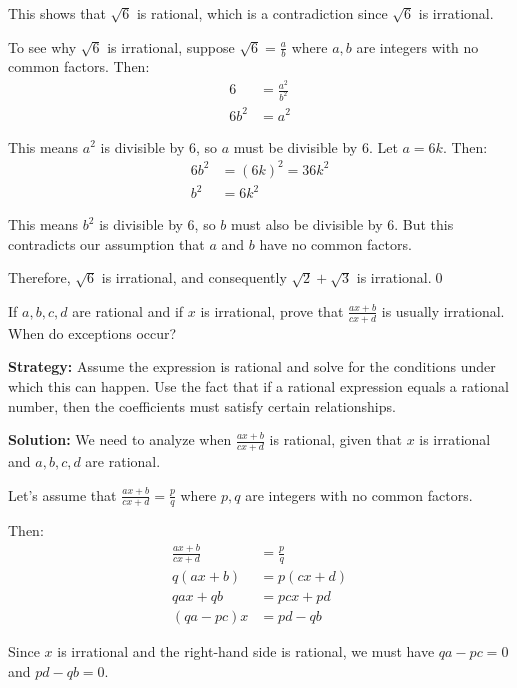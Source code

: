 This shows that $\sqrt{6}$ is rational, which is a contradiction since $\sqrt{6}$ is irrational.

To see why $\sqrt{6}$ is irrational, suppose $\sqrt{6} = \frac{a}{b}$ where $a, b$ are integers with no common factors. Then:
\begin{align*}
6 &= \frac{a^2}{b^2} \\
6b^2 &= a^2
\end{align*}

This means $a^2$ is divisible by 6, so $a$ must be divisible by 6. Let $a = 6k$. Then:
\begin{align*}
6b^2 &= (6k)^2 = 36k^2 \\
b^2 &= 6k^2
\end{align*}

This means $b^2$ is divisible by 6, so $b$ must also be divisible by 6. But this contradicts our assumption that $a$ and $b$ have no common factors.

Therefore, $\sqrt{6}$ is irrational, and consequently $\sqrt{2} + \sqrt{3}$ is irrational.\qed


\begin{problembox}
If $a, b, c, d$ are rational and if $x$ is irrational, prove that $\frac{ax + b}{cx + d}$ is usually irrational. When do exceptions occur?
\end{problembox}

\noindent\textbf{Strategy:} Assume the expression is rational and solve for the conditions under which this can happen. Use the fact that if a rational expression equals a rational number, then the coefficients must satisfy certain relationships.

\bigskip\noindent\textbf{Solution:}
We need to analyze when $\frac{ax + b}{cx + d}$ is rational, given that $x$ is irrational and $a, b, c, d$ are rational.

Let's assume that $\frac{ax + b}{cx + d} = \frac{p}{q}$ where $p, q$ are integers with no common factors.

Then:
\begin{align*}
\frac{ax + b}{cx + d} &= \frac{p}{q} \\
q(ax + b) &= p(cx + d) \\
qax + qb &= pcx + pd \\
(qa - pc)x &= pd - qb
\end{align*}

Since $x$ is irrational and the right-hand side is rational, we must have $qa - pc = 0$ and $pd - qb = 0$.

